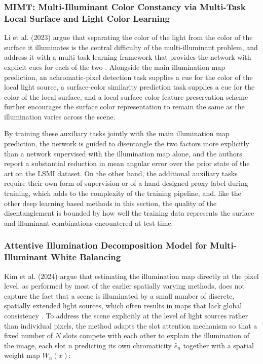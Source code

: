 \subsubsection{MIMT: Multi-Illuminant Color Constancy via Multi-Task Local Surface and Light Color Learning}

Li et al. (2023) argue that separating the color of the light from the color of the surface it illuminates is the central difficulty of the multi-illuminant problem, and address it with a multi-task learning framework that provides the network with explicit cues for each of the two \cite{li2023mimtmultiilluminantcolorconstancy}. Alongside the main illumination map prediction, an achromatic-pixel detection task supplies a cue for the color of the local light source, a surface-color similarity prediction task supplies a cue for the color of the local surface, and a local surface color feature preservation scheme further encourages the surface color representation to remain the same as the illumination varies across the scene.

By training these auxiliary tasks jointly with the main illumination map prediction, the network is guided to disentangle the two factors more explicitly than a network supervised with the illumination map alone, and the authors report a substantial reduction in mean angular error over the prior state of the art on the LSMI dataset. On the other hand, the additional auxiliary tasks require their own form of supervision or of a hand-designed proxy label during training, which adds to the complexity of the training pipeline, and, like the other deep learning based methods in this section, the quality of the disentanglement is bounded by how well the training data represents the surface and illuminant combinations encountered at test time.

\subsubsection{Attentive Illumination Decomposition Model for Multi-Illuminant White Balancing}

Kim et al. (2024) argue that estimating the illumination map directly at the pixel level, as performed by most of the earlier spatially varying methods, does not capture the fact that a scene is illuminated by a small number of discrete, spatially extended light sources, which often results in maps that lack global consistency \cite{kim2024attentive}. To address the scene explicitly at the level of light sources rather than individual pixels, the method adapts the slot attention mechanism so that a fixed number of $N$ slots compete with each other to explain the illumination of the image, each slot $n$ predicting its own chromaticity $\hat{e}_n$ together with a spatial weight map $W_n(x)$:

